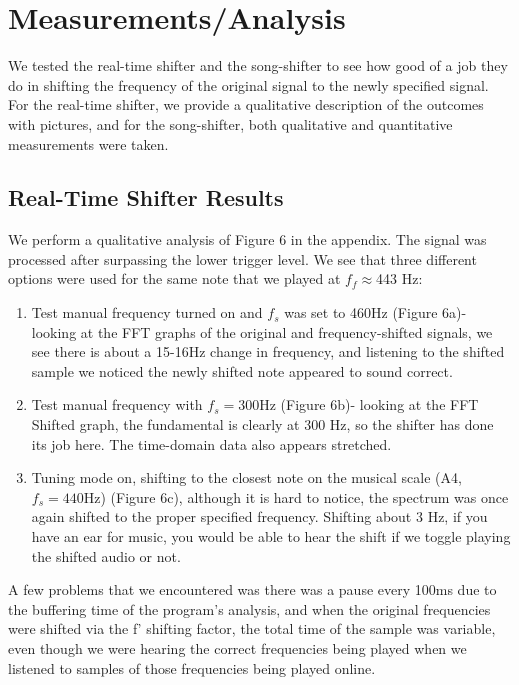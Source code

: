 \documentclass{article}
\begin{document}
\section{Measurements/Analysis}
    We tested the real-time shifter and the song-shifter to see how good of a job they do in shifting the frequency of the original signal to the newly specified signal. For the real-time shifter, we provide a qualitative description of the outcomes with pictures, and for the song-shifter, both qualitative and quantitative measurements were taken.
    \subsection{Real-Time Shifter Results}
        We perform a qualitative analysis of Figure 6 in the appendix. The signal was processed after surpassing the lower trigger level. We see that three different options were used for the same note that we played at $f_f \approx$443 Hz:
        \begin{enumerate}
            \item Test manual frequency turned on and $f_s$ was set to 460Hz (Figure 6a)- looking at the FFT graphs of the original and frequency-shifted signals, we see there is about a 15-16Hz change in frequency, and listening to the shifted sample we noticed the newly shifted note appeared to sound correct.
            \item Test manual frequency with $f_s = 300$Hz (Figure 6b)- looking at the FFT Shifted graph, the fundamental is clearly at 300 Hz, so the shifter has done its job here. The time-domain data also appears stretched.
            \item Tuning mode on, shifting to the closest note on the musical scale (A4, $f_s = 440$Hz) (Figure 6c), although it is hard to notice, the spectrum was once again shifted to the proper specified frequency. Shifting about 3 Hz, if you have an ear for music, you would be able to hear the shift if we toggle playing the shifted audio or not.
        \end{enumerate}
        A few problems that we encountered was there was a pause every 100ms due to the buffering time of the program's analysis, and when the original frequencies were shifted via the f' shifting factor, the total time of the sample was variable, even though we were hearing the correct frequencies being played when we listened to samples of those frequencies being played online.
\end{document}
